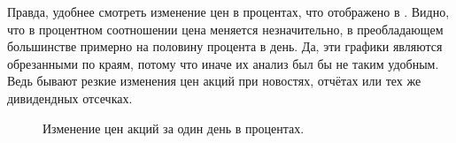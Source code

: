 \documentclass[12pt, a4paper]{article}
\begin{document}
Правда, удобнее смотреть изменение цен в процентах, что отображено в . Видно, что в процентном соотношении цена меняется незначительно, в преобладающем большинстве примерно на половину процента в день. Да, эти графики являются обрезанными по краям, потому что иначе их анализ был бы не таким удобным. Ведь бывают резкие изменения цен акций при новостях, отчётах или тех же дивидендных отсечках.
\begin{figure}[h!]
\caption{Изменение цен акций за один день в процентах.}
\label{fig:day_cost_percent_change}
\end{figure}
\end{document}
